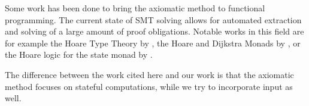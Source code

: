 Some work has been done to bring the axiomatic method to functional programming.
The current state of SMT solving allows for automated extraction and solving of a large amount of proof obligations.
Notable works in this field are for example the Hoare Type Theory by \citet{NanevskiMB2006}, the Hoare and Dijkstra Monads by \citet{NanevskiMSGB08, SwamyWSCL2013}, or the Hoare logic for the state monad by \citet{Swierstra2009}.

The difference between the work cited here and our work is that the axiomatic method focuses on stateful computations, while we try to incorporate input as well.
